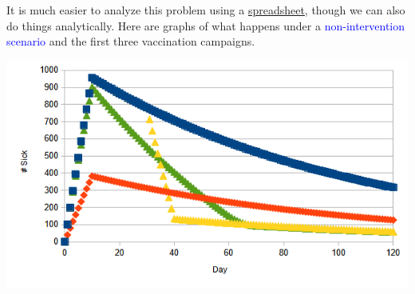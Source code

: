 It is much easier to analyze this problem using a \href{http://math.uci.edu/~ndonalds/math8/virus.xlsx}{spreadsheet,} though we can also do things analytically. Here are graphs of what happens under a \textcolor{blue}{non-intervention scenario} and the first three vaccination campaigns.
\begin{center}
	\includegraphics[scale=0.69]{vax-new}
\end{center}

\goodbreak


